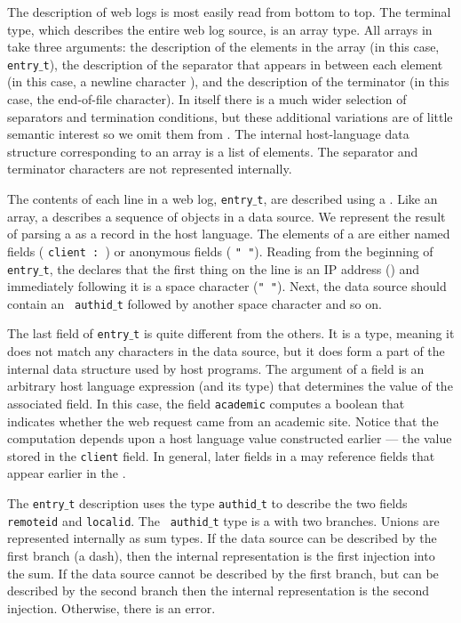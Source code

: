 The \ipads{} description of web logs is most easily read from bottom to top.
The terminal type, which describes the entire web log source, is an array type.
All arrays in \ipads{} take three arguments: the description
of the elements in the array (in this case, {\tt entry$\_$t}),
the description of the separator that appears in between each element
(in this case, a newline character \Peor{}), and 
the description of the terminator (in this case, the end-of-file character).
In \pads{} itself there is a much wider selection of separators and
termination conditions, but these additional variations are of little semantic 
interest so we omit them from \ipads.  
The internal host-language data structure corresponding to
an array is a list of elements.
The separator and terminator characters are not 
represented internally.

The contents of each line in a web log, 
{\tt entry$\_$t}, are described using a
\Pstruct.  Like an array, a \Pstruct{} describes a sequence of 
objects in a data source.  We represent the result of parsing a \Pstruct{} 
as a record in the host language.  The elements
of a \Pstruct{} are either named fields (\eg{} {\tt client : \Pip{}}) or
anonymous fields (\eg{} {\tt " "}).  Reading from the beginning of {\tt
entry$\_$t}, the \Pstruct{} declares that the first thing on the line
is an IP address (\Pip) and immediately following it is a space
character ({\tt " "}).  Next, the data source should contain an {\tt
authid$\_$t} followed by another space character and so on.

The last field of {\tt entry$\_$t} is quite different from the others.
It is a \Pcompute{} type, meaning it does not match any characters in
the data source, but it does form a part of the internal data structure
used by host programs.  The argument of a \Pcompute{}
field is an arbitrary host language expression (and its
type) that determines the value of the associated field.  In this case, the
field {\tt academic} computes a boolean that indicates whether 
the web request came from an academic site. Notice that the computation
depends upon a host language value constructed earlier --- the value
stored in the {\tt client} field.  In general, later fields in a \Pstruct{} may
reference fields that appear earlier in the \Pstruct{}.

The {\tt entry$\_$t} description uses the type {\tt authid$\_$t} to
describe the two fields {\tt remoteid} and {\tt localid}.  The {\tt
authid$\_$t} type is a \Punion{} with two branches.  Unions are
represented internally as sum types.  If the data source can be
described by the first branch (a dash), then the internal
representation is the first injection into the sum.  If the data
source cannot be described by the first branch, but can be described
by the second branch then the internal representation is the second
injection.  Otherwise, there is an error.

